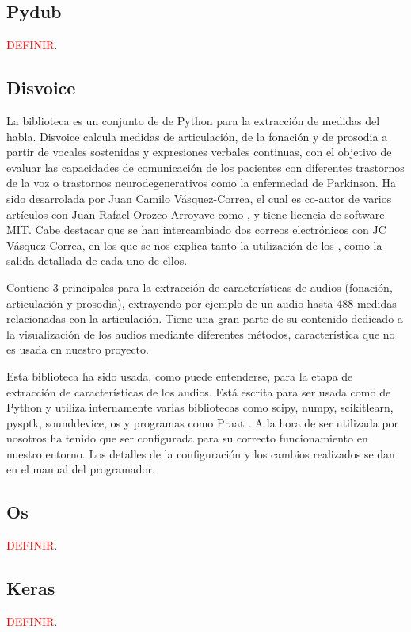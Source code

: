 \subsection{Pydub}
\textcolor{red}{DEFINIR}.

\subsection{Disvoice}
La biblioteca   \cite{neurospeech} es un conjunto de  de Python para la extracción de medidas del habla. Disvoice calcula medidas de articulación, de la fonación y de prosodia a partir de vocales sostenidas y expresiones verbales continuas, con el objetivo de evaluar las capacidades de comunicación de los pacientes con diferentes trastornos de la voz o trastornos neurodegenerativos como la enfermedad de Parkinson. Ha sido desarrolada por Juan Camilo Vásquez-Correa, el cual es co-autor de varios artículos con Juan Rafael Orozco-Arroyave como \cite{neurospeech}, y tiene licencia de software MIT. Cabe destacar que se han intercambiado dos correos electrónicos con JC Vásquez-Correa, en los que se nos explica tanto la utilización de los , como la salida detallada de cada uno de ellos.

Contiene 3  principales para la extracción de características de audios (fonación, articulación y prosodia), extrayendo por ejemplo de un audio hasta 488 medidas relacionadas con la articulación. Tiene una gran parte de su contenido dedicado a la visualización de los audios mediante diferentes métodos, característica que no es usada en nuestro proyecto. 

Esta biblioteca ha sido usada, como puede entenderse, para la etapa de extracción de características de los audios. Está escrita para ser usada como  de Python y utiliza internamente varias bibliotecas como scipy, numpy, scikitlearn, pysptk, sounddevice, os y programas como Praat \cite{praat}. A la hora de ser utilizada por nosotros ha tenido que ser configurada para su correcto funcionamiento en nuestro entorno. Los detalles de la configuración y los cambios realizados se dan en el manual del programador.


\subsection{Os}
\textcolor{red}{DEFINIR}.

\subsection{Keras}
\textcolor{red}{DEFINIR}. 

